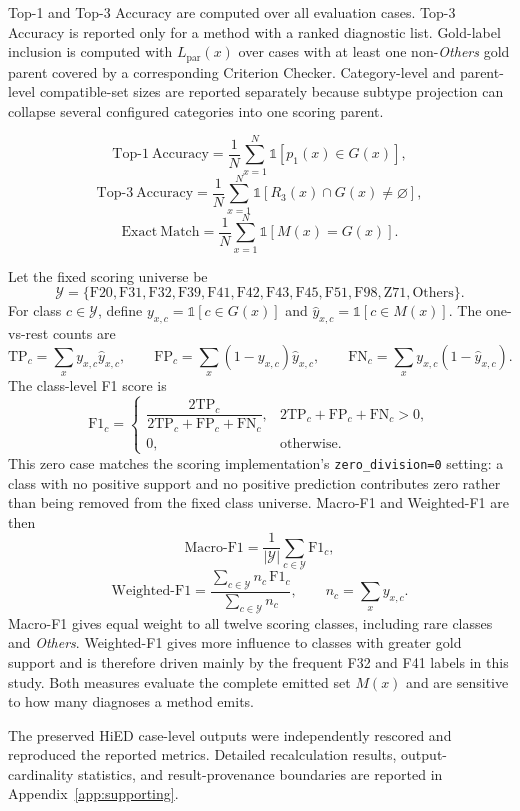 \documentclass[12pt,a4paper,oneside]{report}
\begin{document}
Top-1 and Top-3 Accuracy are computed over all evaluation cases. Top-3 Accuracy is reported only for a method with a ranked diagnostic list. Gold-label inclusion is computed with $L_{\mathrm{par}}(x)$ over cases with at least one non-\emph{Others} gold parent covered by a corresponding Criterion Checker. Category-level and parent-level compatible-set sizes are reported separately because subtype projection can collapse several configured categories into one scoring parent.

\[
\mathrm{Top\text{-}1\ Accuracy}=\frac{1}{N}\sum_{x=1}^{N}\mathbb{1}[p_1(x)\in G(x)],
\]
\[
\mathrm{Top\text{-}3\ Accuracy}=\frac{1}{N}\sum_{x=1}^{N}\mathbb{1}[R_3(x)\cap G(x)\neq\varnothing],
\]
\[
\mathrm{Exact\ Match}=\frac{1}{N}\sum_{x=1}^{N}\mathbb{1}[M(x)=G(x)].
\]

Let the fixed scoring universe be
\[
\mathcal{Y}=\{\mathrm{F20},\mathrm{F31},\mathrm{F32},\mathrm{F39},\mathrm{F41},\mathrm{F42},\mathrm{F43},\mathrm{F45},\mathrm{F51},\mathrm{F98},\mathrm{Z71},\mathrm{Others}\}.
\]
For class $c\in\mathcal{Y}$, define $y_{x,c}=\mathbb{1}[c\in G(x)]$ and $\hat{y}_{x,c}=\mathbb{1}[c\in M(x)]$. The one-vs-rest counts are
\[
\mathrm{TP}_c=\sum_x y_{x,c}\hat{y}_{x,c},\qquad
\mathrm{FP}_c=\sum_x (1-y_{x,c})\hat{y}_{x,c},\qquad
\mathrm{FN}_c=\sum_x y_{x,c}(1-\hat{y}_{x,c}).
\]
The class-level F1 score is
\[
\mathrm{F1}_c=
\begin{cases}
\dfrac{2\mathrm{TP}_c}{2\mathrm{TP}_c+\mathrm{FP}_c+\mathrm{FN}_c}, & 2\mathrm{TP}_c+\mathrm{FP}_c+\mathrm{FN}_c>0,\\[6pt]
0, & \text{otherwise}.
\end{cases}
\]
This zero case matches the scoring implementation's \texttt{zero\_division=0} setting: a class with no positive support and no positive prediction contributes zero rather than being removed from the fixed class universe. Macro-F1 and Weighted-F1 are then
\[
\mathrm{Macro\text{-}F1}=\frac{1}{|\mathcal{Y}|}\sum_{c\in\mathcal{Y}}\mathrm{F1}_c,
\]
\[
\mathrm{Weighted\text{-}F1}=\frac{\sum_{c\in\mathcal{Y}} n_c\,\mathrm{F1}_c}{\sum_{c\in\mathcal{Y}} n_c},
\qquad n_c=\sum_x y_{x,c}.
\]
Macro-F1 gives equal weight to all twelve scoring classes, including rare classes and \emph{Others}. Weighted-F1 gives more influence to classes with greater gold support and is therefore driven mainly by the frequent F32 and F41 labels in this study. Both measures evaluate the complete emitted set $M(x)$ and are sensitive to how many diagnoses a method emits.

The preserved HiED case-level outputs were independently rescored and
reproduced the reported metrics. Detailed recalculation results,
output-cardinality statistics, and result-provenance boundaries are
reported in Appendix~\ref{app:supporting}.
\end{document}
